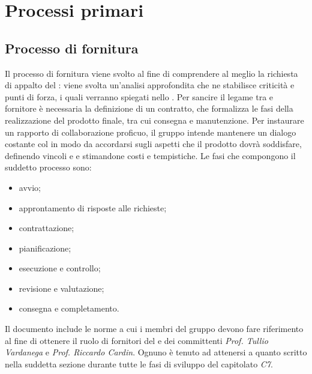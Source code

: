 \section{Processi primari}
\subsection{Processo di fornitura}

Il processo di fornitura viene svolto al fine di comprendere al meglio la richiesta di appalto del : viene svolta un'analisi approfondita che ne stabilisce criticità e punti di forza, i quali verranno spiegati nello \SdF{}. Per sancire il legame tra  e fornitore è necessaria la definizione di un contratto, che formalizza le fasi della realizzazione del prodotto finale, tra cui consegna e manutenzione. Per instaurare un rapporto di collaborazione proficuo, il gruppo intende mantenere un dialogo costante col  in modo da accordarsi sugli aspetti che il prodotto dovrà soddisfare, definendo vincoli e  e stimandone costi e tempistiche.
Le fasi che compongono il suddetto processo sono: 
\begin{itemize}
	\item avvio;
	\item approntamento di risposte alle richieste;
	\item contrattazione;
	\item pianificazione;
	\item esecuzione e controllo;
	\item revisione e valutazione;
	\item consegna e completamento.
\end{itemize}
Il documento include le norme a cui i membri del gruppo \Gruppo{} devono fare riferimento al fine di ottenere il ruolo di fornitori del  \proponente{} e dei committenti \textit{Prof. Tullio Vardanega} e \textit{Prof. Riccardo Cardin}. Ognuno è tenuto ad attenersi a quanto scritto nella suddetta sezione durante tutte le fasi di sviluppo del capitolato \textit{C7}.

